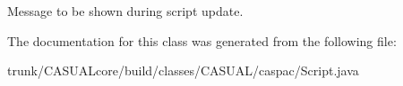 Message to be shown during script update. 

The documentation for this class was generated from the following file\-:\begin{DoxyCompactItemize}
\item 
trunk/\-C\-A\-S\-U\-A\-Lcore/build/classes/\-C\-A\-S\-U\-A\-L/caspac/Script.\-java\end{DoxyCompactItemize}
